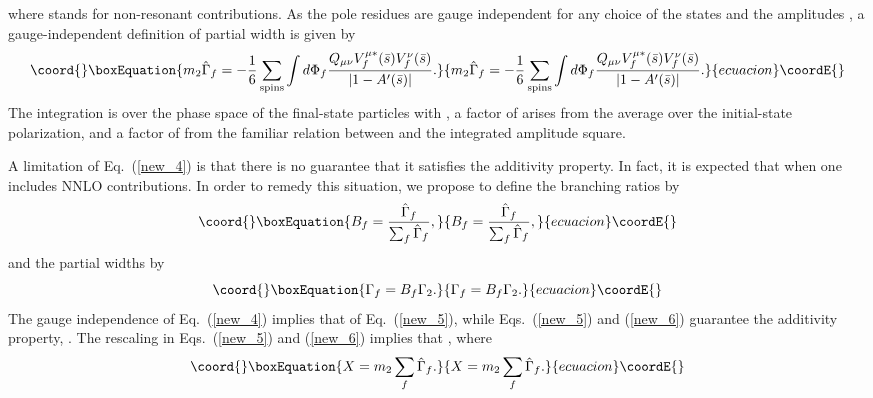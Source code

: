\documentclass[a4paper,12pt]{article}
\begin{document}
where \coordHE{} stands for non-resonant contributions. 
As the pole residues
\coordHE{} are
gauge independent for any choice of the states \coordHE{} and the amplitudes \coordHE{},
a gauge-independent definition of partial width is given by 
\begin{equation}\coord{}\boxEquation{
\label{new_4}
m_2\hat\Gamma_f=-{1\over 6}\sum_{\rm spins}\int d\Phi_f 
\frac{Q_{\mu\nu}V_f^{\mu*}(\bar s)V_f^\nu(\bar s)}
{\left|1-A^\prime(\bar s)\right|}.
}{
m_2\hat\Gamma_f=-{1\over 6}\sum_{\rm spins}\int d\Phi_f 
\frac{Q_{\mu\nu}V_f^{\mu*}(\bar s)V_f^\nu(\bar s)}
{\left|1-A^\prime(\bar s)\right|}.
}{ecuacion}\coordE{}\end{equation}
The integration is over the phase space of the final-state particles with
\coordHE{}, a factor of \coordHE{} arises from the average over the
initial-state polarization, and a factor of \coordHE{} from the familiar relation
between \coordHE{} and the integrated amplitude square. 

A limitation of Eq.~(\ref{new_4}) is that there is no guarantee that it
satisfies the additivity property.
In fact, it is expected that \coordHE{} when one
includes NNLO contributions.
In order to remedy this situation, we propose to define the branching ratios
by 
\begin{equation}\coord{}\boxEquation{
\label{new_5}
B_f=\frac{\hat\Gamma_f}{\sum_f\hat\Gamma_f},
}{
B_f=\frac{\hat\Gamma_f}{\sum_f\hat\Gamma_f},
}{ecuacion}\coordE{}\end{equation}
and the partial widths by 
\begin{equation}\coord{}\boxEquation{
\label{new_6}
\Gamma_f=B_f\Gamma_2.  
}{
\Gamma_f=B_f\Gamma_2.  
}{ecuacion}\coordE{}\end{equation}
The gauge independence of Eq.~(\ref{new_4}) implies that of Eq.~(\ref{new_5}),
while Eqs.~(\ref{new_5}) and (\ref{new_6}) guarantee the additivity property,
\coordHE{}.
The rescaling in Eqs.~(\ref{new_5}) and (\ref{new_6}) implies that
\coordHE{}, where
\begin{equation}\coord{}\boxEquation{
\label{new_7}
X=m_2\sum_f\hat\Gamma_f.
}{
X=m_2\sum_f\hat\Gamma_f.
}{ecuacion}\coordE{}\end{equation}
\end{document}

